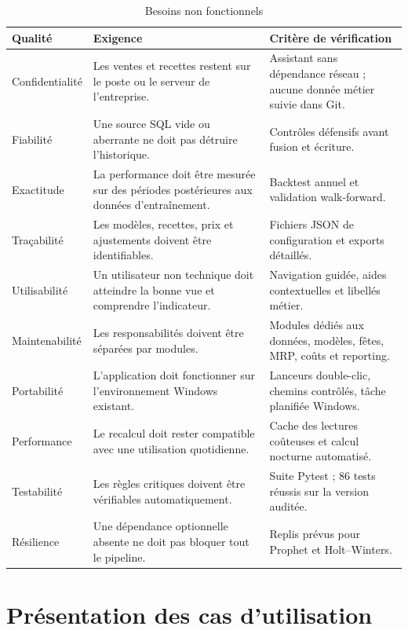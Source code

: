 \begin{table}[H]
\centering
\caption{Besoins non fonctionnels}
\label{tab:non-fonctionnels}
\begin{tabularx}{\textwidth}{p{3.4cm}Yp{4.2cm}}
\toprule
\textbf{Qualité} & \textbf{Exigence} & \textbf{Critère de vérification} \\
\midrule
Confidentialité & Les ventes et recettes restent sur le poste ou le serveur de l'entreprise. & Assistant sans dépendance réseau ; aucune donnée métier suivie dans Git. \\
Fiabilité & Une source SQL vide ou aberrante ne doit pas détruire l'historique. & Contrôles défensifs avant fusion et écriture. \\
Exactitude & La performance doit être mesurée sur des périodes postérieures aux données d'entraînement. & Backtest annuel et validation walk-forward. \\
Traçabilité & Les modèles, recettes, prix et ajustements doivent être identifiables. & Fichiers JSON de configuration et exports détaillés. \\
Utilisabilité & Un utilisateur non technique doit atteindre la bonne vue et comprendre l'indicateur. & Navigation guidée, aides contextuelles et libellés métier. \\
Maintenabilité & Les responsabilités doivent être séparées par modules. & Modules dédiés aux données, modèles, fêtes, MRP, coûts et reporting. \\
Portabilité & L'application doit fonctionner sur l'environnement Windows existant. & Lanceurs double-clic, chemins contrôlés, tâche planifiée Windows. \\
Performance & Le recalcul doit rester compatible avec une utilisation quotidienne. & Cache des lectures coûteuses et calcul nocturne automatisé. \\
Testabilité & Les règles critiques doivent être vérifiables automatiquement. & Suite Pytest ; 86 tests réussis sur la version auditée. \\
Résilience & Une dépendance optionnelle absente ne doit pas bloquer tout le pipeline. & Replis prévus pour Prophet et Holt--Winters. \\
\bottomrule
\end{tabularx}
\end{table}

\section{Présentation des cas d'utilisation}

